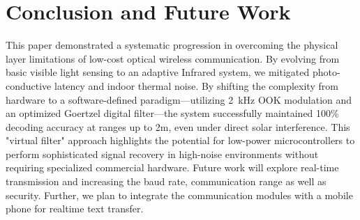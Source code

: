 \documentclass[conference]{IEEEtran}
\begin{document}

\section{Conclusion and Future Work}
This paper demonstrated a systematic progression in overcoming the physical layer limitations of low-cost optical wireless communication. By evolving from basic visible light sensing to an adaptive Infrared system, we mitigated photo-conductive latency and indoor thermal noise. By shifting the complexity from hardware to a software-defined paradigm—utilizing 2~kHz OOK modulation and an optimized Goertzel digital filter—the system successfully maintained 100\% decoding accuracy at ranges up to 2m, even under direct solar interference. This "virtual filter" approach highlights the potential for low-power microcontrollers to perform sophisticated signal recovery in high-noise environments without requiring specialized commercial hardware. Future work will explore real-time transmission and increasing the baud rate, communication range as well as security.  Further, we plan to integrate the communication modules with a mobile phone for realtime text transfer. 




\appendices

\section{}
\label{app:hardware}
\end{document}
